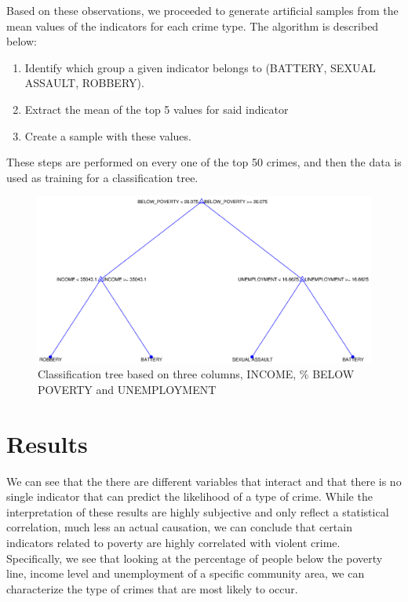\documentclass[a4paper,10pt]{article}
\begin{document}
Based on these observations, we proceeded to generate artificial samples from the mean values of the indicators for each crime type. The algorithm is described below:

\begin{enumerate}
	\item Identify which group a given indicator belongs to (BATTERY, SEXUAL ASSAULT, ROBBERY).
	\item Extract the mean of the top 5 values for said indicator
	\item Create a sample with these values.
\end{enumerate}

These steps are performed on every one of the top 50 crimes, and then the data is used as training for a classification tree.

\begin{figure}[H]
	\includegraphics[width=\linewidth]{media/tree.eps}
	\caption{Classification tree based on three columns, INCOME, \% BELOW POVERTY and UNEMPLOYMENT}
\end{figure}

\section{Results}

We can see that the there are different variables that interact and that there is no single indicator that can predict the likelihood of a type of crime. While the interpretation of these results are highly subjective and only reflect a statistical correlation, much less an actual causation, we can conclude that certain indicators related to poverty are highly correlated with violent crime.\\

Specifically, we see that looking at the percentage of people below the poverty line, income level and unemployment of a specific community area, we can characterize the type of crimes that are most likely to occur.\\
\end{document}
